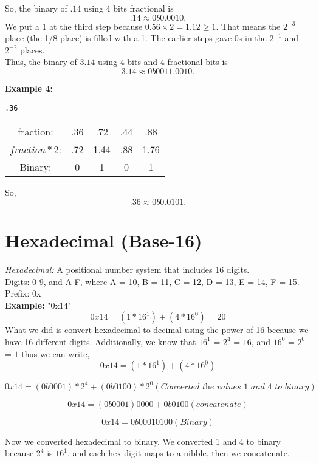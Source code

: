 \documentclass{article}
\begin{document}
\noindent So, the binary of $.14$ using 4 bits fractional is 
\[
.14 \approx 0b0.0010.
\]
We put a 1 at the third step because $0.56 \times 2 = 1.12 \geq 1$.  
That means the $2^{-3}$ place (the 1/8 place) is filled with a 1.  
The earlier steps gave 0s in the $2^{-1}$ and $2^{-2}$ places. \\

\noindent Thus, the binary of $3.14$ using 4 bits and 4 fractional bits is 
\[
3.14 \approx 0b0011.0010. 
\]

\noindent \textbf{Example 4:}

\texttt{.36 } \\

\begin{center}
\begin{tabular}{c c c c c}
fraction: & .36 & .72 & .44 & .88 \\
$fraction * 2$: & .72 & 1.44 & .88 & 1.76 \\
Binary: & 0 & 1 & 0 & 1 \\
\end{tabular}
\end{center}

\noindent So,
\[
.36 \approx 0b0.0101.
\]

\section{Hexadecimal (Base-16)}
\textit{Hexadecimal:} A positional number system that includes 16 digits. \\

\noindent Digits: 0-9, and A-F, where A = 10, B = 11, C = 12, D = 13, E = 14, F = 15. \\

\noindent Prefix: 0x \\

\textbf{Example:} "0x14"
\[
0x14 = (1 * 16^1) + (4 * 16^0) = 20
\]
What we did is convert hexadecimal to decimal using the power of 16 because we have 16 different digits. 
Additionally, we know that $16^1$ = $2^4$ = $16$, and $16^0$ = $2^0$ = $1$ thus we can write,
\[
0x14 = (1 * 16^1) + (4 * 16^0)
\]

\[
0x14 = (0b0001) * 2^4 + (0b0100) * 2^0 (\textit{Converted the values 1 and 4 to binary})
\]

\[
0x14 = (0b0001) 0000 + 0b0100  (\textit{concatenate})
\]

\[
    0x14 = 0b0001 0100 (\textit{Binary})
\]

Now we converted hexadecimal to binary. We converted 1 and 4 to binary because $2^4$ is $16^1$, and 
each hex digit maps to a nibble, then we concatenate. \\
\end{document}
